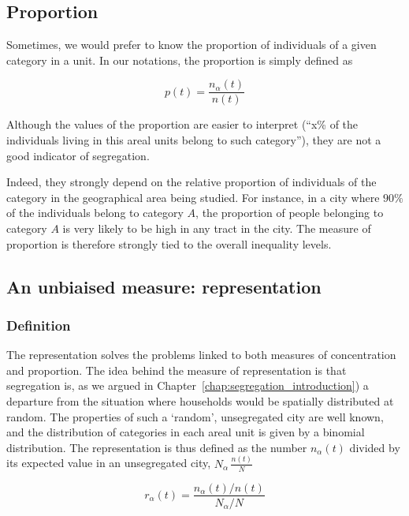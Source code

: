 \subsection{Proportion}
\label{sub:proportion}

Sometimes, we would prefer to know the proportion of individuals of a given
category in a unit. In our notations, the proportion is simply defined as 

\begin{equation}
    p(t) = \frac{n_\alpha(t)}{n(t)}
\end{equation}

Although the values of the proportion are easier to interpret (``x\% of the
individuals living in this areal units belong to such category''), they are
not a good indicator of segregation. 

Indeed, they strongly depend on the relative proportion of individuals of the
category in the geographical area being studied. For instance, in a city where
$90\%$ of the individuals belong to category $A$, the proportion of people
belonging to category $A$ is very likely to be high in any tract in the city.
The measure of proportion is therefore strongly tied to the overall inequality
levels.


\subsection{An unbiaised measure: representation}
\label{sub:an_unbiaised_measure_the_representation}

\subsubsection{Definition}
\label{ssub:definition}

The representation solves the problems linked to both measures of concentration
and proportion. The idea behind the measure of representation is that
segregation is, as we argued in Chapter~\ref{chap:segregation_introduction}) a
departure from the situation where households would be spatially distributed
at random. The properties of such a `random', unsegregated city are well known,
and the distribution of categories in each areal unit is given by a binomial
distribution. The representation is
thus defined as the number $n_\alpha(t)$ divided by its expected value in an
unsegregated city, $N_\alpha\,\frac{n(t)}{N}$

\begin{equation}
    r_\alpha(t) = \frac{n_\alpha(t)/n(t)}{N_\alpha/N}
    \label{eq:representation}
\end{equation}

